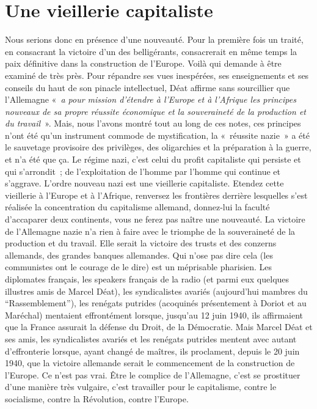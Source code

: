\documentclass[french,twoside]{book} %
\begin{document}
\section[{Une vieillerie capitaliste}]{Une vieillerie capitaliste}
\noindent Nous serions donc en présence d’une nouveauté. Pour la première fois un traité, en consacrant la victoire d’un des belligérants, consacrerait en même temps la paix définitive dans la construction de l’Europe. Voilà qui demande à être examiné de très près. Pour répandre ses vues inespérées, ses enseignements et ses conseils du haut de son pinacle intellectuel, Déat affirme sans sourcillier que l’Allemagne « \emph{a pour mission d’étendre à l’Europe et à l’Afrique les principes nouveaux de sa propre réussite économique et la souveraineté de la production et du travail} ». Mais, nous l’avons montré tout au long de ces notes, ces principes n’ont été qu’un instrument commode de mystification, la « réussite nazie » a été le sauvetage provisoire des privilèges, des oligarchies et la préparation à la guerre, et n’a été que ça. Le régime nazi, c’est celui du profit capitaliste qui persiste et qui s’arrondit ; de l’exploitation de l’homme par l’homme qui continue et s’aggrave. L’ordre nouveau nazi est une vieillerie capitaliste. Etendez cette vieillerie à l’Europe et à l’Afrique, renversez les frontières derrière lesquelles s’est réalisée la concentration du capitalisme allemand, donnez-lui la faculté d’accaparer deux continents, vous ne ferez pas naître une nouveauté. La victoire de l’Allemagne nazie n’a rien à faire avec le triomphe de la souveraineté de la production et du travail. Elle serait la victoire des trusts et des conzerns allemands, des grandes banques allemandes. Qui n’ose pas dire cela (les communistes ont le courage de le dire) est un méprisable pharisien. Les diplomates français, les speakers français de la radio (et parmi eux quelques illustres amis de Marcel Déat), les syndicalistes avariés (aujourd’hui mambres du “Rassemblement”), les renégats putrides (acoquinés présentement à Doriot et au Maréchal) mentaient effrontément lorsque, jusqu’au 12 juin 1940, ils affirmaient que la France assurait la défense du Droit, de la Démocratie. Mais Marcel Déat et ses amis, les syndicalistes avariés et les renégats putrides mentent avec autant d’effronterie lorsque, ayant changé de maîtres, ils proclament, depuis le 20 juin 1940, que la victoire allemande serait le commencement de la construction de l’Europe. Ce n’est pas vrai. Être le complice de l’Allemagne, c’est se prostituer d’une manière très vulgaire, c’est travailler pour le capitalisme, contre le socialisme, contre la Révolution, contre l’Europe.
\end{document}
